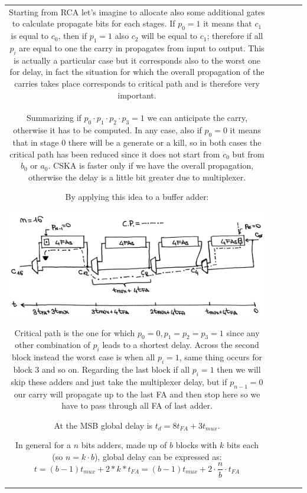 \begin{center}
\begin{tabular}{|c|c|c|c|c|}
Starting from RCA let's imagine to allocate also some additional gates to calculate propagate bits for each stages. If $p_0=1$ it means that $c_1$ is equal to $c_0$, then if $p_1=1$ also $c_2$ will be equal to $c_1$; therefore if all $p_i$ are equal to one the carry in propagates from input to output. This is actually a particular case but it corresponds also to the worst one for delay, in fact the situation for which the overall propagation of the carries takes place corresponds to critical path and is therefore very important.\\

Summarizing if $p_0\cdot p_1 \cdot p_2 \cdot p_3=1$ we can anticipate the carry, otherwise it has to be computed. In any case, also if $p_0=0$ it means that in stage 0 there will be a generate or a kill, so in both cases the critical path has been reduced since it does not start from $c_0$ but from $b_0$ or $a_0$. CSKA is faster only if we have the overall propagation, otherwise the delay is a little bit greater due to multiplexer.

By applying this idea to a buffer adder:

\begin{center}
  \includegraphics[width=0.8\linewidth]{img/img2/5}
\end{center}


Critical path is the one for which $p_0=0, p_1=p_2=p_3=1$ since any other combination of $p_i$ leads to a shortest delay. Across the second block instead the worst case is when all $p_i =1$, same thing occurs for block 3 and so on. Regarding the last block if all $p_i=1$ then we will skip these adders and just take the multiplexer delay, but if $p_{n-1}=0$ our carry will propagate up to the last FA and then stop here so we have to pass through all FA of last adder.

At the MSB global delay is $t_d=8t_{FA}+3t_{mux}$.

In general for a $n$ bits adders, made up of $b$ blocks with $k$ bits each (so $n=k \cdot b$), global delay can be expressed as:
$$t= (b-1)t_{mux} + 2 *k* t_{FA}= (b-1)t_{mux} + 2 \cdot \frac{n}{b} \cdot t_{FA}$$


\end{tabular}
\end{center}
